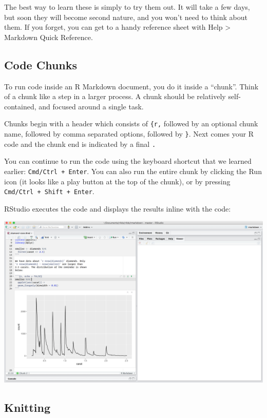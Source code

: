 \documentclass[]{book}
\begin{document}
The best way to learn these is simply to try them out. It will take a few days, but soon they will become second nature, and you won't need to think about them. If you forget, you can get to a handy reference sheet with Help \textgreater{} Markdown Quick Reference.

\hypertarget{code-chunks}{%
\subsection{Code Chunks}\label{code-chunks}}

To run code inside an R Markdown document, you do it inside a ``chunk''. Think of a chunk like a step in a larger process. A chunk should be relatively self-contained, and focused around a single task.

Chunks begin with a header which consists of \texttt{\textasciigrave{}\textasciigrave{}\textasciigrave{}\{r,} followed by an optional chunk name, followed by comma separated options, followed by \texttt{\}}. Next comes your R code and the chunk end is indicated by a final \texttt{\textasciigrave{}\textasciigrave{}\textasciigrave{}.}

You can continue to run the code using the keyboard shortcut that we learned earlier: \texttt{Cmd/Ctrl\ +\ Enter}. You can also run the entire chunk by clicking the Run icon (it looks like a play button at the top of the chunk), or by pressing \texttt{Cmd/Ctrl\ +\ Shift\ +\ Enter}.

RStudio executes the code and displays the results inline with the code:

\includegraphics{img/r-markdown.png}

\hypertarget{knitting}{%
\subsection{Knitting}\label{knitting}}
\end{document}
